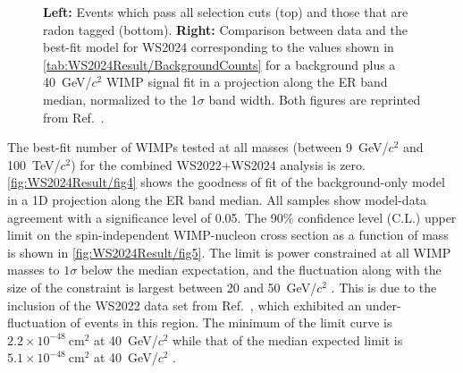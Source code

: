 \begin{figure}[!ht]
	\caption[The final set of events passing all selection cuts with the panels distinguishing all events in WS2024 from those that are radon tagged. Alongside the comparison between data and the best-fit model for the WS2024 model is shown.]{\textbf{Left:} Events which pass all selection cuts (top) and those that are radon tagged (bottom). \textbf{Right:} Comparison between data and the best-fit model for WS2024 corresponding to the values shown in \autoref{tab:WS2024Result/BackgroundCounts} for a background plus a 40~GeV/$c^2$ WIMP signal fit in a projection along the ER band median, normalized to the 1$\sigma$ band width. Both figures are reprinted from Ref.~\cite{LZCollaboration:2024lux}.}
	\label{fig:WS2024Result/fig3_fig4}
\end{figure}

The best-fit number of WIMPs tested at all masses (between 9~GeV/$c^2$ and 100~TeV/$c^2$) for the combined WS2022+WS2024 analysis is zero. \autoref{fig:WS2024Result/fig4} shows the goodness of fit of the background-only model in a 1D projection along the ER band median. All samples show model-data agreement with a significance level of 0.05. The 90\% confidence level (C.L.) upper limit on the spin-independent WIMP-nucleon cross section as a function of mass is shown in \autoref{fig:WS2024Result/fig5}. The limit is power constrained at all WIMP masses to $1\sigma$ below the median expectation, and the fluctuation along with the size of the constraint is largest between 20 and 50~GeV/$c^2$ \cite{LZCollaboration:2024lux}. This is due to the inclusion of the WS2022 data set from Ref.~\cite{LZ:2022lsv}, which exhibited an under-fluctuation of events in this region. The minimum of the limit curve is $2.2\times10^{-48}~\text{cm}^2$ at 40~GeV/$c^2$ while that of the median expected limit is $5.1\times10^{-48}~\text{cm}^2$ at 40~GeV/$c^2$ \cite{LZCollaboration:2024lux}.

